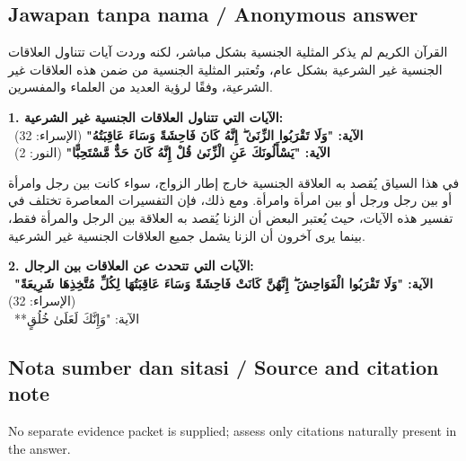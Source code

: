 \documentclass[11pt,a4paper]{article}
\newcommand{\ar}[1]{{\arabicfont #1}}
\begin{document}
\subsection*{Jawapan tanpa nama / Anonymous answer}
\ar{القرآن} \ar{الكريم} \ar{لم} \ar{يذكر} \ar{المثلية} \ar{الجنسية} \ar{بشكل} \ar{مباشر،} \ar{لكنه} \ar{وردت} \ar{آيات} \ar{تتناول} \ar{العلاقات} \ar{الجنسية} \ar{غير} \ar{الشرعية} \ar{بشكل} \ar{عام،} \ar{وتُعتبر} \ar{المثلية} \ar{الجنسية} \ar{من} \ar{ضمن} \ar{هذه} \ar{العلاقات} \ar{غير} \ar{الشرعية،} \ar{وفقًا} \ar{لرؤية} \ar{العديد} \ar{من} \ar{العلماء} \ar{والمفسرين}.\par\medskip \textbf{1. \textbf{\ar{الآيات} \ar{التي} \ar{تتناول} \ar{العلاقات} \ar{الجنسية} \ar{غير} \ar{الشرعية}:}}\\ \textbullet\ \textbf{\ar{الآية}: "\ar{وَلَا} \ar{تَقْرَبُوا} \ar{الزِّنَىٰ} \ar{ۖ} \ar{إِنَّهُ} \ar{كَانَ} \ar{فَاحِشَةً} \ar{وَسَاءَ} \ar{عَاقِبَتُهُ}"} (\ar{الإسراء}: 32)\\ \textbullet\ \textbf{\ar{الآية}: "\ar{يَسْأَلُونَكَ} \ar{عَنِ} \ar{الْزِّنَىٰ} \ar{قُلْ} \ar{إِنَّهُ} \ar{كَانَ} \ar{حَدٌّ} \ar{مَّسْتَحِبًّا}"} (\ar{النور}: 2)\par\medskip \ar{الزنا} \ar{في} \ar{هذا} \ar{السياق} \ar{يُقصد} \ar{به} \ar{العلاقة} \ar{الجنسية} \ar{خارج} \ar{إطار} \ar{الزواج،} \ar{سواء} \ar{كانت} \ar{بين} \ar{رجل} \ar{وامرأة} \ar{أو} \ar{بين} \ar{رجل} \ar{ورجل} \ar{أو} \ar{بين} \ar{امرأة} \ar{وامرأة}. \ar{ومع} \ar{ذلك،} \ar{فإن} \ar{التفسيرات} \ar{المعاصرة} \ar{تختلف} \ar{في} \ar{تفسير} \ar{هذه} \ar{الآيات،} \ar{حيث} \ar{يُعتبر} \ar{البعض} \ar{أن} \ar{الزنا} \ar{يُقصد} \ar{به} \ar{العلاقة} \ar{بين} \ar{الرجل} \ar{والمرأة} \ar{فقط،} \ar{بينما} \ar{يرى} \ar{آخرون} \ar{أن} \ar{الزنا} \ar{يشمل} \ar{جميع} \ar{العلاقات} \ar{الجنسية} \ar{غير} \ar{الشرعية}.\par\medskip \textbf{2. \textbf{\ar{الآيات} \ar{التي} \ar{تتحدث} \ar{عن} \ar{العلاقات} \ar{بين} \ar{الرجال}:}}\\ \textbullet\ \textbf{\ar{الآية}: "\ar{وَلَا} \ar{تَقْرَبُوا} \ar{الْفَوَاحِشَ} \ar{ۖ} \ar{إِنَّهُنَّ} \ar{كَانَتْ} \ar{فَاحِشَةً} \ar{وَسَاءَ} \ar{عَاقِبَتُهَا} \ar{لِكُلِّ} \ar{مُتَّخِذِهَا} \ar{شَرِيعَةً}"} (\ar{الإسراء}: 32)\\ \textbullet\ **\ar{الآية}: "\ar{وَإِنَّكَ} \ar{لَعَلَىٰ} \ar{خُلُقٍ}

\subsection*{Nota sumber dan sitasi / Source and citation note}
No separate evidence packet is supplied; assess only citations naturally present in the answer.
\end{document}
